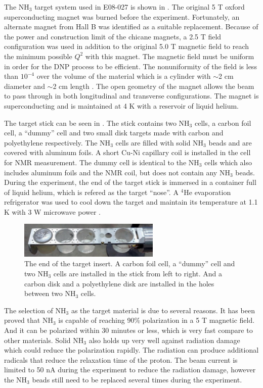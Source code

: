 The NH${}_3$ target system used in E08-027 is shown in . The original 5 T oxford superconducting magnet was burned before the experiment. Fortunately, an alternate magnet from Hall B was identified as a suitable replacement. Because of the power and construction limit of the chicane magnets, a 2.5 T field configuration was used in addition to the original 5.0 T magnetic field to reach the minimum possible $Q^2$ with this magnet. The magnetic field must be uniform in order for the DNP process to be efficient. The nonuniformity of the field is less than $10^{−4}$ over the volume of the material which is a cylinder with $\sim$2 cm diameter and $\sim$2 cm length \cite{Pierce2014}. The open geometry of the magnet allows the beam to pass through in both longitudinal and transverse configurations. The magnet is superconducting and is maintained at 4 K with a reservoir of liquid helium.

The target stick can be seen in . The stick contains two NH${}_3$ cells, a carbon foil cell, a ``dummy'' cell and two small disk targets made with carbon and polyethylene respectively. The NH${}_3$ cells are filled with solid NH${}_3$ beads and are covered with aluminum foils. A short Cu-Ni capillary coil is installed in the cell for NMR measurement. The dummy cell is identical to the NH${}_3$ cells which also includes aluminum foils and the NMR coil, but does not contain any NH${}_3$ beads. During the experiment, the end of the target stick is immersed in a container full of liquid helium, which is refered as the target ``nose''. A ${}^4$He evaporation refrigerator was used to cool down the target and maintain its temperature at 1.1 K with 3 W microwave power \cite{Pierce2014}.

\begin{figure}[tb!]
  \centering
  \includegraphics[width=0.6\textwidth]{figs/target-insert.png}
  \caption[The end of the target insert.]{The end of the target insert. A carbon foil cell, a ``dummy'' cell and two NH${}_3$ cells are installed in the stick from left to right. And a carbon disk and a polyethylene disk are installed in the holes between two NH${}_3$ cells. \label{C5S3SS2F2}}
\end{figure}

The selection of NH${}_3$ as the target material is due to several reasons. It has been proved that NH${}_3$ is capable of reaching 90\% polarization in a 5 T magnetic field. And it can be polarized within 30 minutes or less, which is very fast compare to other materials. Solid NH${}_3$ also holds up very well against radiation damage which could reduce the polarization rapidly. The radiation can produce additional radicals that reduce the relaxation time of the proton. The beam current is limited to 50 nA during the experiment to reduce the radiation damage, however the NH${}_3$ beads still need to be replaced several times during the experiment.

